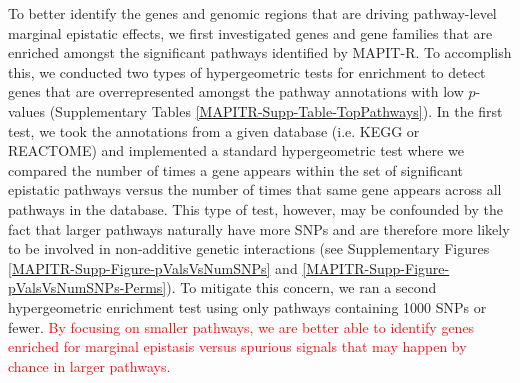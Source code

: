 \documentclass[10pt]{article}
\begin{document}
To better identify the genes and genomic regions that are driving pathway-level marginal epistatic effects, we first investigated genes and gene families that are enriched amongst the significant pathways identified by MAPIT-R. To accomplish this, we conducted two types of hypergeometric tests for enrichment to detect genes that are overrepresented amongst the pathway annotations with low $p$-values (Supplementary Tables \ref{MAPITR-Supp-Table-TopPathways}). In the first test, we took the annotations from a given database (i.e. KEGG or REACTOME) and implemented a standard hypergeometric test where we compared the number of times a gene appears within the set of significant epistatic pathways versus the number of times that same gene appears across all pathways in the database. This type of test, however, may be confounded by the fact that larger pathways naturally have more SNPs and are therefore more likely to be involved in non-additive genetic interactions (see Supplementary Figures \ref{MAPITR-Supp-Figure-pValsVsNumSNPs} and \ref{MAPITR-Supp-Figure-pValsVsNumSNPs-Perms}). To mitigate this concern, we ran a second hypergeometric enrichment test using only pathways containing 1000 SNPs or fewer. \textcolor{red}{By focusing on smaller pathways, we are better able to identify genes enriched for marginal epistasis versus spurious signals that may happen by chance in larger pathways.} 
\end{document}
